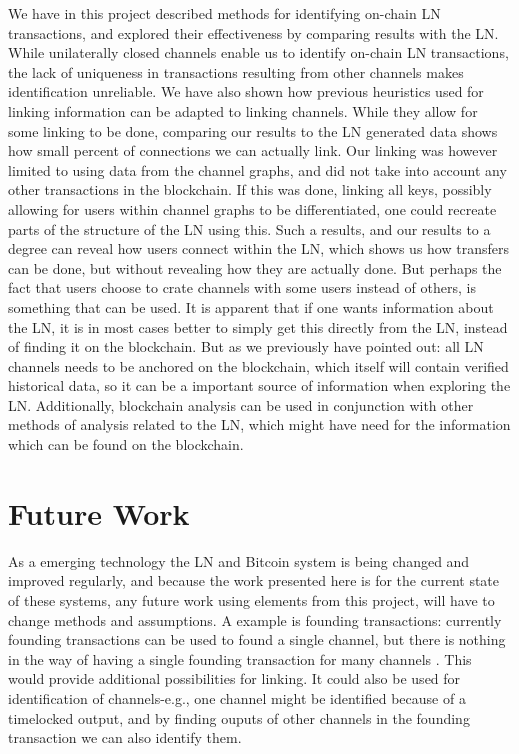 We have in this project described methods for identifying on-chain LN transactions, and explored their effectiveness by comparing results with the LN. While unilaterally closed channels enable us to identify on-chain LN transactions, the lack of uniqueness in transactions resulting from other channels makes identification unreliable. We have also shown how previous heuristics used for linking information can be adapted to linking channels. While they allow for some linking to be done, comparing our results to the LN generated data shows how small percent of connections we can actually link. Our linking was however limited to using data from the channel graphs, and did not take into account any other transactions in the blockchain. If this was done, linking all keys, possibly allowing for users within channel graphs to be differentiated, one could recreate parts of the structure of the LN using this. Such a results, and our results to a degree can reveal how users connect within the LN, which shows us how transfers can be done, but without revealing how they are actually done.
But perhaps the fact that users choose to crate channels with some users instead of others, is something that can be used.
It is apparent that if one wants information about the LN, it is in most cases better to simply get this directly from the LN, instead of finding it on the blockchain. But as we previously have pointed out: all LN channels needs to be anchored on the blockchain, which itself will contain verified historical data, so it can be a important source of information when exploring the LN. Additionally, blockchain analysis can be used in conjunction with other methods of analysis related to the LN, which might have need for the information which can be found on the blockchain.

\section{Future Work}
\label{sec:future}

As a emerging technology the LN and Bitcoin system is being changed and improved regularly, and because the work presented here is for the current state of these systems, any future work using elements from this project, will have to change methods and assumptions. A example is founding transactions: currently founding transactions can be used to found a single channel, but there is nothing in the way of having a single founding transaction for many channels \cite{multi_channel_founding}. This would provide additional possibilities for linking. It could also be used for identification of channels-e.g., one channel might be identified because of a timelocked output, and by finding ouputs of other channels in the founding transaction we can also identify them.
\\

